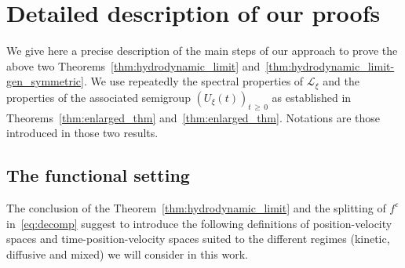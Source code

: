 \documentclass[10pt]{amsart}
\theoremstyle{definition}\newtheorem{defi}[theo]{Definition}\newtheorem{rema}[theo]{Remark}\newtheorem{exam}[theo]{Example}\newtheorem{exem}[theo]{Example}\newtheorem{nota}[theo]{Notation}
\newcommand{\LL}{\mathcal{L}}
\renewcommand*\ge{\geqslant}
\newcommand*\eps{{\varepsilon}}
\begin{document}
\section{Detailed description of our proofs}\label{sec:detail}

We give here a precise description of the main steps of our approach to prove the above two Theorems~\ref{thm:hydrodynamic_limit} and~\ref{thm:hydrodynamic_limit-gen_symmetric}. We use repeatedly the spectral properties of $\LL_\xi$ and the properties of the associated semigroup $(U_\xi(t))_{t\,\ge\,0}$ as established in Theorems~\ref{thm:enlarged_thm} and~\ref{thm:enlarged_thm}. Notations are those introduced in those two results.


\subsection{The functional setting}

The conclusion of the Theorem~\ref{thm:hydrodynamic_limit} and the splitting of $f^\eps$ in~\eqref{eq:decomp} suggest to introduce the following definitions of position-velocity spaces and time-position-velocity spaces suited to the different regimes (kinetic, diffusive and mixed) we will consider in this work.
\end{document}
